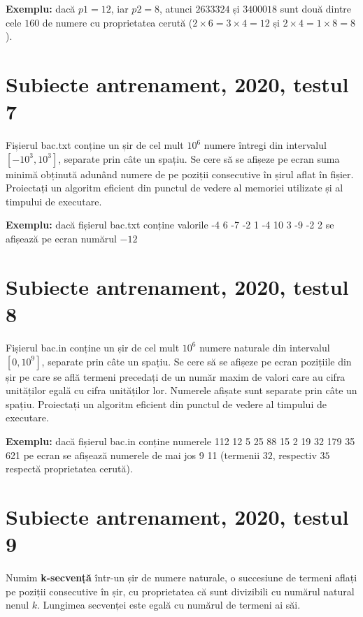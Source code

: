 \documentclass[10pt, a4paper]{article}
\newcommand{\highlight}[1]{{\ttfamily\color{red}#1}}
\begin{document}
\vspace{0.2cm}
\noindent \textbf{Exemplu:} dacă \highlight{$p1=12$}, iar \highlight{$p2=8$}, atunci \highlight{$2633324$} și \highlight{$3400018$} sunt două dintre cele \highlight{$160$} de numere cu proprietatea cerută (\highlight{$2\times6=3\times4=12$} și \highlight{$2\times4=1\times8=8$}).


\section{Subiecte antrenament, 2020, testul 7}
Fișierul \highlight{bac.txt} conține un șir de cel mult \highlight{$10^6$} numere întregi din intervalul \highlight{$[-10^3,10^3]$}, separate prin câte un spațiu. Se cere să se afișeze pe ecran suma minimă obținută adunând numere de pe poziții consecutive în șirul aflat în fișier. Proiectați un algoritm eficient din punctul de vedere al memoriei utilizate și al timpului de executare.

\vspace{0.2cm}
\noindent \textbf{Exemplu:} dacă fișierul \highlight{bac.txt} conține valorile \highlight{-4 6 -7 -2 1 -4 10 3 -9 -2 2} se afișează pe ecran numărul \highlight{$-12$}

\newpage
\section{Subiecte antrenament, 2020, testul 8}
Fișierul \highlight{bac.in} conține un șir de cel mult \highlight{$10^6$} numere naturale din intervalul \highlight{$[0,10^9]$}, separate prin câte un spațiu. Se cere să se afișeze pe ecran pozițiile din șir pe care se află termeni precedați de un număr maxim de valori care au cifra unităților egală cu cifra unităților lor. Numerele afișate sunt separate prin câte un spațiu. Proiectați un algoritm eficient din punctul de vedere al timpului de executare.

\vspace{0.2cm}
\noindent \textbf{Exemplu:} dacă fișierul \highlight{bac.in} conține numerele \highlight{112 12 5 25 88 15 2 19 32 179 35 621} pe ecran se afișează numerele de mai jos \highlight{9 11} (termenii \highlight{$32$}, respectiv \highlight{$35$} respectă proprietatea cerută).

\section{Subiecte antrenament, 2020, testul 9}
Numim \textbf{k-secvență} într-un șir de numere naturale, o succesiune de termeni aflați pe poziții consecutive în șir, cu proprietatea că sunt divizibili cu numărul natural nenul \highlight{$k$}. Lungimea secvenței este egală cu numărul de termeni ai săi.
\end{document}
